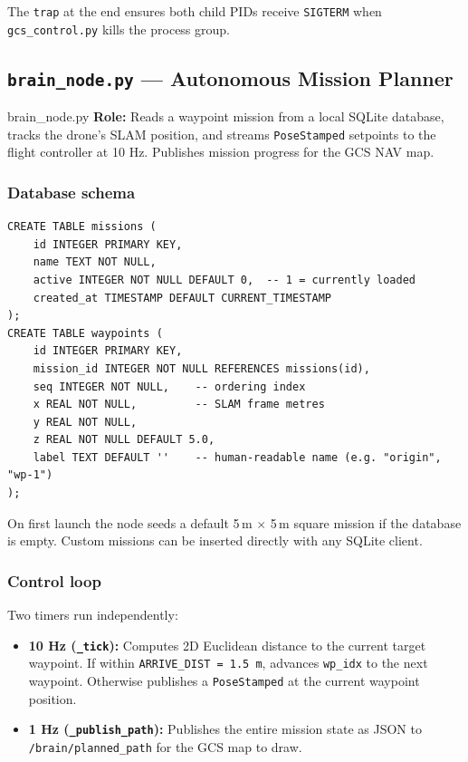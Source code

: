 \documentclass[11pt,a4paper]{article}
\begin{document}
The \texttt{trap} at the end ensures both child PIDs receive \texttt{SIGTERM}
when \texttt{gcs\_control.py} kills the process group.

\subsection{\texttt{brain\_node.py} — Autonomous Mission Planner}

\begin{filebox}{brain\_node.py}
\textbf{Role:} Reads a waypoint mission from a local SQLite database, tracks
the drone's SLAM position, and streams \texttt{PoseStamped} setpoints to the
flight controller at 10 Hz. Publishes mission progress for the GCS NAV map.
\end{filebox}

\subsubsection{Database schema}

\begin{lstlisting}[style=python, caption=SQLite schema -- missions and waypoints]
CREATE TABLE missions (
    id INTEGER PRIMARY KEY,
    name TEXT NOT NULL,
    active INTEGER NOT NULL DEFAULT 0,  -- 1 = currently loaded
    created_at TIMESTAMP DEFAULT CURRENT_TIMESTAMP
);
CREATE TABLE waypoints (
    id INTEGER PRIMARY KEY,
    mission_id INTEGER NOT NULL REFERENCES missions(id),
    seq INTEGER NOT NULL,    -- ordering index
    x REAL NOT NULL,         -- SLAM frame metres
    y REAL NOT NULL,
    z REAL NOT NULL DEFAULT 5.0,
    label TEXT DEFAULT ''    -- human-readable name (e.g. "origin", "wp-1")
);
\end{lstlisting}

On first launch the node seeds a default 5\,m $\times$ 5\,m square mission if
the database is empty. Custom missions can be inserted directly with any SQLite
client.

\subsubsection{Control loop}

Two timers run independently:

\begin{itemize}
  \item \textbf{10 Hz (\texttt{\_tick}):} Computes 2D Euclidean distance to the
        current target waypoint. If within \texttt{ARRIVE\_DIST = 1.5\,m},
        advances \texttt{wp\_idx} to the next waypoint. Otherwise publishes a
        \texttt{PoseStamped} at the current waypoint position.
  \item \textbf{1 Hz (\texttt{\_publish\_path}):} Publishes the entire mission
        state as JSON to \texttt{/brain/planned\_path} for the GCS map to draw.
\end{itemize}
\end{document}
